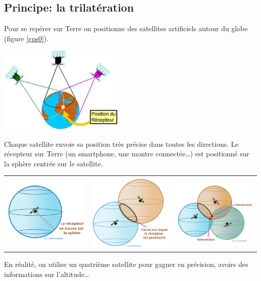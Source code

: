 \documentclass[a4paper,11pt]{article}
\begin{document}
\subsection{Principe: la trilatération}
Pour se repérer sur Terre on positionne des satellites artificiels autour du globe (figure \ref{gps0}).
\begin{center}
    \centering
    \includegraphics[width=6cm]{ressources/gps0.jpg}
    \label{gps0}
\end{center}
Chaque satellite envoie sa position très précise dans toutes les directions. Le récepteur sur Terre (un smartphone, une montre connectée\dots) est positionné sur la sphère centrée sur le satellite.
\begin{center}
    \begin{tabular}{ccc}
        \includegraphics[width=5cm]{ressources/gps1.png}
        &
        \includegraphics[width=5cm]{ressources/gps2.png}
        &
        \includegraphics[width=5cm]{ressources/gps3.png}
        \\
    \end{tabular}
\end{center}
\begin{aretenir}[Remarque]
En réalité, on utilise un quatrième satellite pour gagner en précision, avoirs des informations sur l'altitude\dots
\end{aretenir}
\end{document}
